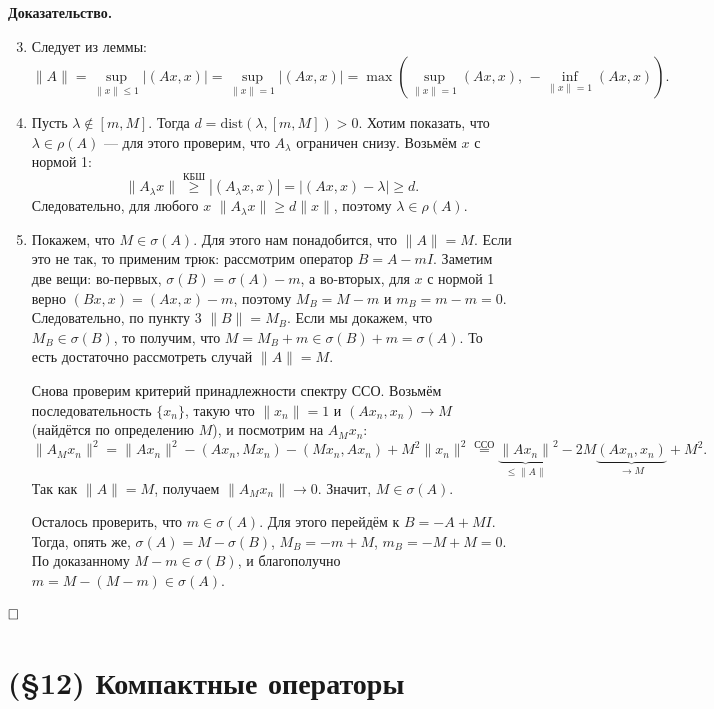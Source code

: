 \documentclass[12pt, a4paper]{article}
\newcommand{\QED}{$\hfill\square$}
\renewcommand{\le}{\leqslant}  %
\renewcommand{\ge}{\geqslant}  %
\begin{document}
\textbf{Доказательство.}
\begin{enumerate}
    \setcounter{enumi}{2}
    \item Следует из леммы:
    \[
        \|A\| = \sup_{\|x\| \le 1}|(Ax, x)| = \sup_{\|x\| = 1}|(Ax, x)| = \max\left(\sup_{\|x\| = 1}(Ax, x), \, -\!\inf_{\|x\| = 1}(Ax, x)\right).
    \]

    \setcounter{enumi}{0}
    \item Пусть $\lambda \notin [m, M]$. Тогда $d = \mathrm{dist}(\lambda, [m, M]) > 0$. Хотим показать, что $\lambda \in \rho(A)$ --- для этого проверим, что $A_\lambda$ ограничен снизу. Возьмём $x$ с нормой 1: 
    \[
        \|A_\lambda x\| \overset{\text{КБШ}}{\ge} |(A_\lambda x, x)| = |(Ax, x) - \lambda| \ge d.
    \]
    Следовательно, для любого $x$ $\|A_\lambda x\| \ge d \|x\|$, поэтому $\lambda \in \rho(A)$.

    \item Покажем, что $M \in \sigma(A)$. Для этого нам понадобится, что $\|A\| = M$. Если это не так, то применим трюк: рассмотрим оператор $B = A - mI$. Заметим две вещи: во-первых, $\sigma(B) = \sigma(A) - m$, а во-вторых, для $x$ с нормой 1 верно $(Bx, x) = (Ax, x) - m$, поэтому $M_B = M - m$ и $m_B = m - m = 0$. Следовательно, по пункту 3 $\|B\| = M_B$. Если мы докажем, что $M_B \in \sigma(B)$, то получим, что $M = M_B + m \in \sigma(B) + m = \sigma(A)$. То есть достаточно рассмотреть случай $\|A\| = M$.

    Снова проверим критерий принадлежности спектру ССО. Возьмём последовательность $\{x_n\}$, такую что $\|x_n\| = 1$ и $(Ax_n, x_n) \to M$ (найдётся по определению $M$), и посмотрим на $A_M x_n$:
    \[
        \|A_M x_n\|^2 = \|Ax_n\|^2 - (Ax_n, Mx_n) - (M x_n, Ax_n) + M^2\|x_n\|^2 \overset{\text{ССО}}{=} {\underbrace{\|Ax_n\|}_{\le \|A\|}}^2 - 2M\underbrace{(Ax_n, x_n)}_{\to M} + M^2.
    \]
    Так как $\|A\| = M$, получаем $\|A_M x_n\| \to 0$. Значит, $M \in \sigma(A)$.
    
    Осталось проверить, что $m \in \sigma(A)$. Для этого перейдём к $B = -A + MI$. Тогда, опять же, $\sigma(A) = M - \sigma(B)$, $M_B = -m + M$, $m_B = -M + M = 0$. По доказанному $M - m \in \sigma(B)$, и благополучно $m = M - (M - m) \in \sigma(A)$.
\end{enumerate}

\QED



\section{(§12) Компактные операторы}
\end{document}
